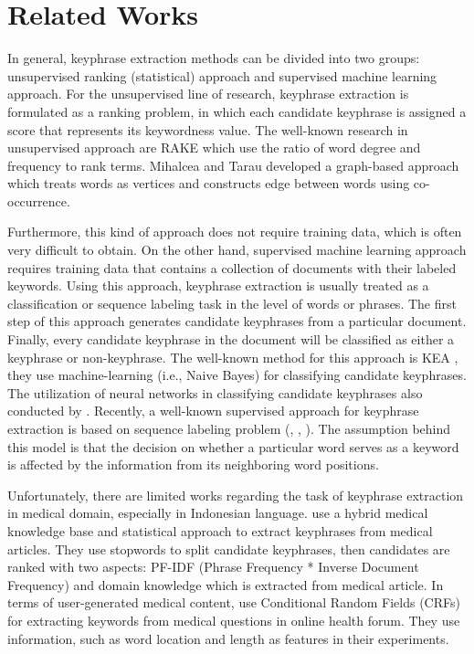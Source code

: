 \section{Related Works}
In general, keyphrase extraction methods can be divided into two groups: unsupervised ranking (statistical) approach and supervised machine learning approach. For the unsupervised line of research, keyphrase extraction is formulated as a ranking problem, in which each candidate keyphrase is assigned a score that represents its keywordness value. The well-known research in unsupervised approach are RAKE \cite{rake} which use the ratio of word degree and frequency to rank terms. Mihalcea and Tarau \cite{mihalcea2004textrank} developed a graph-based approach which treats words as vertices and constructs edge between words using co-occurrence.

Furthermore, this kind of approach does not require training data, which is often very difficult to obtain. On the other hand, supervised machine learning approach requires training data that contains a collection of documents with their labeled keywords. Using this approach, keyphrase extraction is usually treated as a classification or sequence labeling task in the level of words or phrases. The first step of this approach generates candidate keyphrases from a particular document. Finally, every candidate keyphrase in the document will be classified as either a keyphrase or non-keyphrase. The well-known method for this approach is KEA \cite{witten1999kea}, they use machine-learning (i.e., Naive Bayes) for classifying candidate keyphrases. The utilization of neural networks in classifying candidate keyphrases also conducted by \cite{ekpNeuralNetworks}. Recently, a well-known supervised approach for keyphrase extraction is based on sequence labeling problem (\cite{zhang2008automatic}, \cite{cao2010automatically}, \cite{zhang2016keyphrase}). The assumption behind this model is that the decision on whether a particular word serves as a keyword is affected by the information from its neighboring word positions.

Unfortunately, there are limited works regarding the task of keyphrase extraction in medical domain, especially in Indonesian language. \cite{ekpMedicalDocumentHybrid} use a hybrid medical knowledge base and statistical approach to extract keyphrases from medical articles. They use stopwords to split candidate keyphrases, then candidates are ranked with two aspects: PF-IDF (Phrase Frequency * Inverse Document Frequency) and domain knowledge which is extracted from medical article. In terms of user-generated medical content, \cite{cao2010automatically} use Conditional Random Fields (CRFs) for extracting keywords from medical questions in online health forum. They use information, such as word location and length as features in their experiments.

